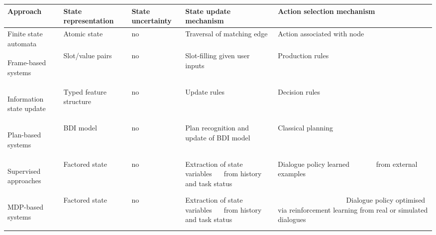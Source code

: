 \renewcommand{\arraystretch}{2.0}
\setlength{\tabcolsep}{8pt}
\begin{table}
\begin{center}
\begin{tabular}{|p{55mm}||p{29mm}|p{16mm}|p{50mm}|p{52mm}|} \hline
\centering \textbf{Approach} &  \centering \textbf{State representation} &  \centering \textbf{State uncertainty} &  \centering \textbf{State update mechanism} & \textbf{Action selection mechanism} \vspace{5pt} \\  \hline \hline
Finite state automata & Atomic state & no & Traversal of matching edge & Action associated with node \vspace{5pt} \\ \hline
Frame-based systems \; \; \; \; \; \; \; \; \; \; \; \; \begin{footnotesize}\citep[e.g.][]{seneff2000}\end{footnotesize}& Slot/value pairs & no & Slot-filling given user inputs & Production rules \vspace{5pt} \\ \hline
Information state update \; \; \; \; \; \; \begin{footnotesize}\citep[e.g.][]{Larsson:2000}\end{footnotesize} & Typed feature $\phantom{bbb}$ structure \vspace{5pt} & no & Update rules & Decision rules \vspace{5pt} \\ \hline
Plan-based systems   \; \;  \; \; \; \; \; \; \; \; \begin{footnotesize}\citep[e.g.][]{Freedman:2000,Allen:2000:AGD:973935.973937}\end{footnotesize} & BDI model \vspace{5pt} & no & Plan recognition and update of BDI model & Classical planning \vspace{5pt} \\ \hline
Supervised approaches \; \; \; \; \; \; \; \; \begin{footnotesize}\citep[e.g.][]{Hurtado:2005}\end{footnotesize} & Factored state & no & Extraction of state variables $\phantom{aa}$ from history and task status & Dialogue policy learned $\phantom{aaaaaa}$ from external examples \vspace{5pt} \\ \hline
MDP-based systems  \; \; \; \; \; \; \; \; \begin{footnotesize}\citep[e.g.][]{Walker:2000,817450}\end{footnotesize} & Factored state & no & Extraction of state variables $\phantom{aa}$ from history and task status &  \multirow{2}{50mm}{$\phantom{aaaaajjjjjaaaaaaaaa}$ Dialogue policy optimised via reinforcement learning from real or simulated dialogues} \vspace{5pt} \\ \cline{1-4}

\end{tabular}
\end{center}
\end{table}
